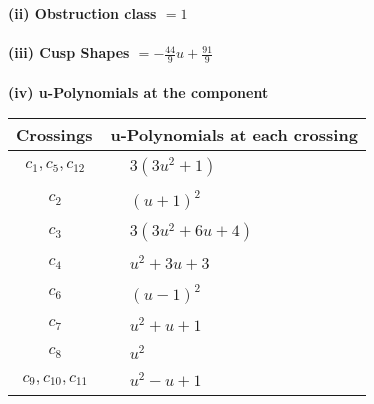 \documentclass[1p]{elsarticle_modified}
\theoremstyle{definition}
\begin{document}
\flushleft \textbf{(ii) Obstruction class $= 1$}\\~\\
\flushleft \textbf{(iii) Cusp Shapes $= -\frac{44}{9} u+\frac{91}{9}$}\\~\\
\newpage\renewcommand{\arraystretch}{1}
\flushleft \textbf{(iv) u-Polynomials at the component}\newline \\
\begin{tabular}{m{50pt}|m{274pt}}
Crossings & \hspace{64pt}u-Polynomials at each crossing \\
\hline $$\begin{aligned}c_{1},c_{5},c_{12}\end{aligned}$$&$\begin{aligned}
&3(3 u^2+1)
\end{aligned}$\\
\hline $$\begin{aligned}c_{2}\end{aligned}$$&$\begin{aligned}
&(u+1)^2
\end{aligned}$\\
\hline $$\begin{aligned}c_{3}\end{aligned}$$&$\begin{aligned}
&3(3 u^2+6 u+4)
\end{aligned}$\\
\hline $$\begin{aligned}c_{4}\end{aligned}$$&$\begin{aligned}
&u^2+3 u+3
\end{aligned}$\\
\hline $$\begin{aligned}c_{6}\end{aligned}$$&$\begin{aligned}
&(u-1)^2
\end{aligned}$\\
\hline $$\begin{aligned}c_{7}\end{aligned}$$&$\begin{aligned}
&u^2+u+1
\end{aligned}$\\
\hline $$\begin{aligned}c_{8}\end{aligned}$$&$\begin{aligned}
&u^2
\end{aligned}$\\
\hline $$\begin{aligned}c_{9},c_{10},c_{11}\end{aligned}$$&$\begin{aligned}
&u^2- u+1
\end{aligned}$\\
\hline
\end{tabular}\\~\\
\end{document}

